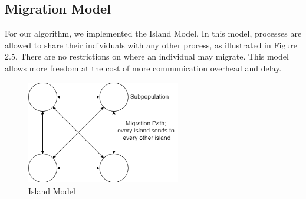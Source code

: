 \subsection{Migration Model}
For our algorithm, we implemented the Island Model. In this model, processes are allowed to share their individuals with any other process, as illustrated in Figure 2.5. There are no restrictions on where an individual may migrate. This model allows more freedom at the cost of more communication overhead and delay.
\begin{figure}[ht]
\includegraphics[width=0.6\textwidth]{images/island_model.png}
\caption{Island Model}
\end{figure}
